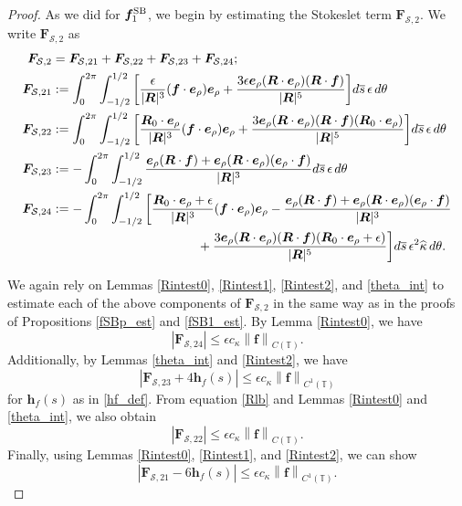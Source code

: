 \documentclass[11pt]{article}
\numberwithin{equation}{section}
\newcommand{\T}{\mathbb{T}}
\newcommand{\bars}{\overline s}
\newcommand{\be}{\bm{e}}
\newcommand{\ts}{\thinspace}
\newcommand{\SB}{{\rm SB}}
\newcommand{\abs}[1]{\left\lvert #1 \right\rvert}
\newcommand{\norm}[1]{\left\lVert #1 \right\rVert}
\newcommand{\wh}[1]{\widehat{#1}}
\newcommand{\mc}[1]{\mathcal{#1}}
\theoremstyle{definition}
\begin{document}
\begin{proof}
As we did for $\bm{f}^{\SB}_1$, we begin by estimating the Stokeslet term $\bm{F}_{\mc{S},2}$. We write $\bm{F}_{\mc{S},2}$ as 
\begin{equation}\label{FS2}
\begin{aligned}
\bm{F}_{\mc{S},2} &= \bm{F}_{\mc{S},21} + \bm{F}_{\mc{S},22} + \bm{F}_{\mc{S},23}+ \bm{F}_{\mc{S},24}; \\
%
\bm{F}_{\mc{S},21} &:= \int_0^{2\pi}\int_{-1/2}^{1/2} \bigg[\frac{\epsilon}{|\bm{R}|^3}({\bm f}\cdot\be_\rho)\be_\rho +\frac{3\epsilon\be_\rho(\bm{R}\cdot\be_{\rho})(\bm{R}\cdot\bm{f})}{|\bm{R}|^5} \bigg] d\bars \ts \epsilon \ts d\theta \\
%
\bm{F}_{\mc{S},22} &:= \int_0^{2\pi}\int_{-1/2}^{1/2} \bigg[\frac{\bm{R}_0\cdot\be_{\rho}}{|\bm{R}|^3}({\bm f}\cdot\be_\rho)\be_\rho +\frac{3\be_\rho(\bm{R}\cdot\be_{\rho})(\bm{R}\cdot\bm{f})(\bm{R}_0\cdot\be_{\rho})}{|\bm{R}|^5}\bigg] d\bars \ts \epsilon \ts d\theta \\
%
\bm{F}_{\mc{S},23} &:= -\int_0^{2\pi}\int_{-1/2}^{1/2} \frac{\be_{\rho}(\bm{R}\cdot\bm{f})+\be_\rho(\bm{R}\cdot\be_{\rho})(\be_{\rho}\cdot\bm{f})}{|\bm{R}|^3} d\bars \ts \epsilon \ts d\theta \\
%
\bm{F}_{\mc{S},24} &:= -\int_0^{2\pi}\int_{-1/2}^{1/2} \bigg[\frac{\bm{R}_0\cdot\be_{\rho}+\epsilon}{|\bm{R}|^3}({\bm f}\cdot\be_\rho)\be_\rho - \frac{\be_{\rho}(\bm{R}\cdot\bm{f})+\be_\rho(\bm{R}\cdot\be_{\rho})(\be_{\rho}\cdot\bm{f})}{|\bm{R}|^3} \\
&\hspace{4cm}+\frac{3\be_\rho(\bm{R}\cdot\be_{\rho})(\bm{R}\cdot\bm{f})(\bm{R}_0\cdot\be_{\rho}+\epsilon)}{|\bm{R}|^5}\bigg] d\bars \ts\epsilon^2\wh\kappa \ts d\theta. 
\end{aligned}
\end{equation}

We again rely on Lemmas \ref{Rintest0}, \ref{Rintest1}, \ref{Rintest2}, and \ref{theta_int} to estimate each of the above components of $\bm{F}_{\mc{S},2}$ in the same way as in the proofs of Propositions \ref{fSBp_est} and \ref{fSB1_est}. By Lemma \ref{Rintest0}, we have
\begin{equation}\label{FS24_est}
\abs{\bm{F}_{\mc{S},24}} \le \epsilon c_\kappa \norm{\bm{f}}_{C(\T)}.
\end{equation}
Additionally, by Lemmas \ref{theta_int} and \ref{Rintest2}, we have
\begin{equation}\label{FS23_est}
 \abs{\bm{F}_{\mc{S},23} + 4\bm{h}_f(s)} \le \epsilon c_\kappa\norm{\bm{f}}_{C^1(\T)}
 \end{equation}
for $\bm{h}_f(s)$ as in \eqref{hf_def}.
From equation \eqref{Rlb} and Lemmas \ref{Rintest0} and \ref{theta_int}, we also obtain
 \begin{equation}\label{FS22_est}
 \abs{\bm{F}_{\mc{S},22}}\le \epsilon c_\kappa\norm{\bm{f}}_{C(\T)}.
 \end{equation}
Finally, using Lemmas \ref{Rintest0}, \ref{Rintest1}, and \ref{Rintest2}, we can show
\begin{equation}\label{FS21_est}
  \abs{\bm{F}_{\mc{S},21}- 6 \bm{h}_f(s)} \le \epsilon c_\kappa \norm{\bm{f}}_{C^1(\T)}.
 \end{equation} 


\end{proof}
\end{document}
